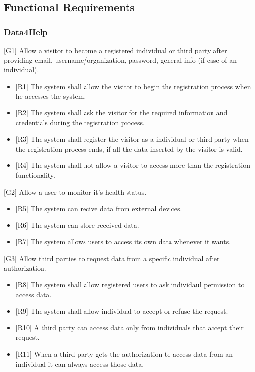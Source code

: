 \documentclass[12pt]{article}
\begin{document}
\subsection{Functional Requirements}
\subsubsection{Data4Help}
[G1] Allow a visitor to become a registered individual or third party after providing email, username/organization, password, general info (if case of an individual). \newline
\begin{itemize}
    \item{[R1]} The system shall allow the visitor to begin the registration process when he accesses the system.
    \item{[R2]} The system shall ask the visitor for the required information and credentials during the registration process.
    \item{[R3]} The system shall register the visitor as a individual or third party when the registration process ends, if all the data inserted by the visitor is valid.
    \item{[R4]} The system shall not allow a visitor to access more than the registration functionality.
\end{itemize}
[G2] Allow a user to monitor it's health status.\newline 
\begin{itemize}
    \item {[R5]} The system can recive data from external devices. 
    \item {[R6]} The system can store received data. 
    \item {[R7]} The system allows users to access its own data whenever it wants.
\end{itemize}
[G3] Allow third parties to request data from a specific individual after authorization.\newline 
\begin{itemize}
    \item {[R8]} The system shall allow registered users to ask individaul permission to access data.
    \item {[R9]} The system shall allow individual to accept or refuse the request. 
    \item {[R10]} A third party can access data only from individuals that accept their request.
    \item {[R11]} When a third party gets the authorization to access data from an individual it can always access those data. 
\end{itemize}
\end{document}
